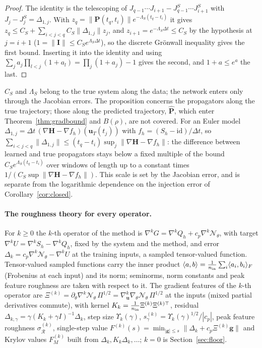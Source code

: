 \documentclass[11pt]{article}
\theoremstyle{definition}
\theoremstyle{remark}
\newcommand{\uu}{\mathbf{u}}
\newcommand{\I}{\mathbf{I}}
\newcommand{\Hop}{\mathbf{H}}
\newcommand{\Rgh}{\mathcal{R}}
\newcommand{\dt}{\Delta t}
\newcommand{\Pp}{\mathbf P}
\newcommand{\Ph}{\hat{\mathbf P}}
\newcommand{\Nn}{\mathcal N_\theta}
\begin{document}
\begin{proof}
The identity is the telescoping of $J_{q-1}\cdots J_{i+1}-J^S_{q-1}\cdots J^S_{i+1}$ with $J_j-J^S_j=\Delta_{1,j}$.
With $z_q=\|\Pp(t_q,t_i)\|e^{-\Lambda_S(t_q-t_i)}$ it gives $z_q\le C_S+\sum_{i<j<q}C_S\|\Delta_{1,j}\|z_j$, and $z_{i+1}=e^{-\Lambda_S\dt}\le C_S$ by the hypothesis at $j=i+1$ ($1=\|\I\|\le C_Se^{\Lambda_S\dt}$), so the discrete Grönwall inequality gives the first bound.
Inserting it into the identity and using $\sum_ja_j\prod_{l<j}(1+a_l)=\prod_j(1+a_j)-1$ gives the second, and $1+a\le e^a$ the last.
\end{proof}

$C_S$ and $\Lambda_S$ belong to the true system along the data; the network enters only through the Jacobian errors. The proposition concerns the propagators along the true trajectory; those along the predicted trajectory, $\Ph$, which enter Theorem~\ref{thm:gradbound} and $B(\rho)$, are not covered.
For an Euler model $\Delta_{1,j}=\dt\,(\nabla\Hop-\nabla f_h)(\uu_T(t_j))$ with $f_h=(S_h-\mathrm{id})/\dt$, so $\sum_{i<j<q}\|\Delta_{1,j}\|\le(t_q-t_i)\sup_j\|\nabla\Hop-\nabla f_h\|$: the difference between learned and true propagators stays below a fixed multiple of the bound $C_Se^{\Lambda_S(t_q-t_i)}$ over windows of length up to a constant times $1/(C_S\sup\|\nabla\Hop-\nabla f_h\|)$.
This scale is set by the Jacobian error, and is separate from the logarithmic dependence on the injection error of Corollary~\ref{cor:closed}.

\paragraph{The roughness theory for every operator.}
For $k\ge0$ the $k$-th operator of the method is $\nabla^kG=\nabla^kQ_h+c_p\nabla^k\Nn$, with target $\nabla^kU=\nabla^kS_h-\nabla^kQ_h$, fixed by the system and the method, and error $\Delta_k=c_p\nabla^k\Nn-\nabla^kU$ at the training inputs, a sampled tensor-valued function.
Tensor-valued sampled functions carry the inner product $\langle a,b\rangle=\frac1{n_{\rm in}}\sum_i\langle a_i,b_i\rangle_F$ (Frobenius at each input) and its norm; seminorms, norm constants and peak feature roughness are taken with respect to it.
The gradient features of the $k$-th operator are $\Xi^{(k)}=\partial_\theta\nabla^k\Nn\,\Pi^{1/2}=\nabla_\uu^k\nabla_\theta\Nn\,\Pi^{1/2}$ at the inputs (mixed partial derivatives commute), with kernel $K_k=\frac1{n_{\rm in}}\Xi^{(k)}\Xi^{(k)\top}$, residual $\Delta_{k,\gamma}=\gamma(K_k+\gamma I)^{-1}\Delta_k$, step size $\Upsilon_k(\gamma)$, $s^{(k)}_\gamma=\Upsilon_k(\gamma)^{1/2}/|c_p|$, peak feature roughness $\sigma^{(k)}_\Rgh$, single-step value $F^{(k)}(s)=\min_{|\mathbf g|\le s}\|\Delta_k+c_p\Xi^{(k)}\mathbf g\|$ and Krylov values $F^{(k)}_M$ built from $\Delta_k,K_k\Delta_k,\dots$; $k=0$ is Section~\ref{sec:floor}.
\end{document}
